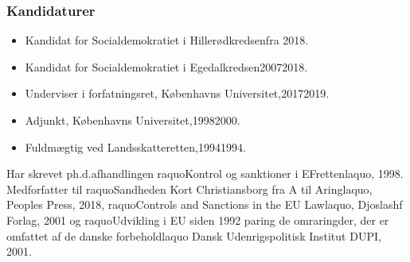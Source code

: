 \documentclass[11pt, a4paper]{awesome-cv}
\begin{document}
\begin{cvletter}
\subsubsection*{Kandidaturer}
\begin{itemize}
\item Kandidat for Socialdemokratiet i Hillerødkredsenfra 2018.
\item Kandidat for Socialdemokratiet i Egedalkredsen20072018.
\end{itemize}
\begin{itemize}
\item Underviser i forfatningsret, Københavns Universitet,20172019.
\item Adjunkt, Københavns Universitet,19982000.
\item Fuldmægtig ved Landsskatteretten,19941994.
\end{itemize}
Har skrevet ph.d.afhandlingen raquoKontrol og sanktioner i EFrettenlaquo, 1998. Medforfatter til raquoSandheden Kort  Christiansborg fra A til Aringlaquo, Peoples Press, 2018, raquoControls and Sanctions in the EU Lawlaquo, Djoslashf Forlag, 2001 og raquoUdvikling i EU siden 1992 paring de omraringder, der er omfattet af de danske forbeholdlaquo Dansk Udenrigspolitisk Institut DUPI, 2001.

\end{cvletter}
\end{document}
